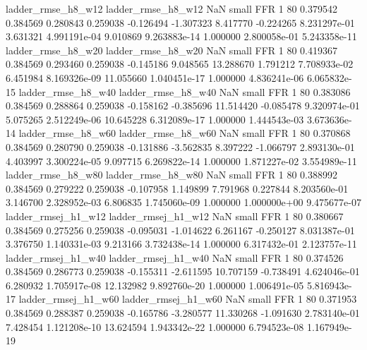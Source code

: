       ladder_rmse_h8_w12       ladder_rmse_h8_w12                   NaN      small      FFR                 1 80 0.379542       0.384569 0.280843       0.259038   -0.126494     -1.307323      8.417770    -0.224265   8.231297e-01  3.631321 4.991191e-04     9.010869   9.263883e-14            1.000000    2.800058e-01        5.243358e-11
      ladder_rmse_h8_w20       ladder_rmse_h8_w20                   NaN      small      FFR                 1 80 0.419367       0.384569 0.293460       0.259038   -0.145186      9.048565     13.288670     1.791212   7.708933e-02  6.451984 8.169326e-09    11.055660   1.040451e-17            1.000000    4.836241e-06        6.065832e-15
      ladder_rmse_h8_w40       ladder_rmse_h8_w40                   NaN      small      FFR                 1 80 0.383086       0.384569 0.288864       0.259038   -0.158162     -0.385696     11.514420    -0.085478   9.320974e-01  5.075265 2.512249e-06    10.645228   6.312089e-17            1.000000    1.444543e-03        3.673636e-14
      ladder_rmse_h8_w60       ladder_rmse_h8_w60                   NaN      small      FFR                 1 80 0.370868       0.384569 0.280790       0.259038   -0.131886     -3.562835      8.397222    -1.066797   2.893130e-01  4.403997 3.300224e-05     9.097715   6.269822e-14            1.000000    1.871227e-02        3.554989e-11
      ladder_rmse_h8_w80       ladder_rmse_h8_w80                   NaN      small      FFR                 1 80 0.388992       0.384569 0.279222       0.259038   -0.107958      1.149899      7.791968     0.227844   8.203560e-01  3.146700 2.328952e-03     6.806835   1.745060e-09            1.000000    1.000000e+00        9.475677e-07
     ladder_rmsej_h1_w12      ladder_rmsej_h1_w12                   NaN      small      FFR                 1 80 0.380667       0.384569 0.275256       0.259038   -0.095031     -1.014622      6.261167    -0.250127   8.031387e-01  3.376750 1.140331e-03     9.213166   3.732438e-14            1.000000    6.317432e-01        2.123757e-11
     ladder_rmsej_h1_w40      ladder_rmsej_h1_w40                   NaN      small      FFR                 1 80 0.374526       0.384569 0.286773       0.259038   -0.155311     -2.611595     10.707159    -0.738491   4.624046e-01  6.280932 1.705917e-08    12.132982   9.892760e-20            1.000000    1.006491e-05        5.816943e-17
     ladder_rmsej_h1_w60      ladder_rmsej_h1_w60                   NaN      small      FFR                 1 80 0.371953       0.384569 0.288387       0.259038   -0.165786     -3.280577     11.330268    -1.091630   2.783140e-01  7.428454 1.121208e-10    13.624594   1.943342e-22            1.000000    6.794523e-08        1.167949e-19
